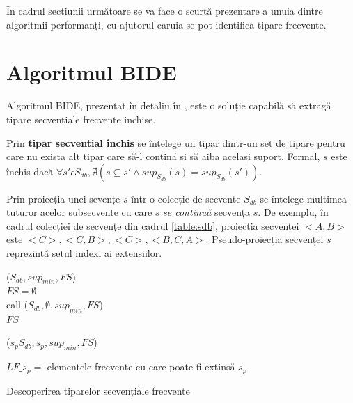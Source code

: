 În cadrul sectiunii următoare se va face o scurtă prezentare a unuia dintre algoritmii performanți, cu ajutorul caruia se pot identifica tipare frecvente. 

\section{Algoritmul BIDE}
Algoritmul BIDE, prezentat în detaliu în \cite{bib:wang2004bide}, este o soluție capabilă să extragă tipare secventiale frecvente inchise.

\begin{defi}
Prin \textbf{tipar secvential închis} se întelege un tipar dintr-un set de tipare pentru care nu exista alt tipar care să-l conțină și să aiba același suport. Formal, $s$ este închis dacă $\forall s' \epsilon S_{db}, \nexists (s \subseteq s' \wedge sup_{S_{db}}(s)=sup_{S_{db}}(s'))$.
\end{defi}  

\begin{defi}
Prin proiecția unei sevențe $s$ într-o colecție de secvente $S_{db}$ se întelege multimea tuturor acelor subsecvente cu care $s$ \textit{se continuă} secvența $s$. De exemplu, în cadrul colecției de secvențe din cadrul \ref{table:sdb}, proiectia secventei $<A,B>$ este {$<C>,<C, B>,<C>,<B, C, A>$}. Pseudo-proiecția secvenței $s$ reprezintă setul indexi ai extensiilor. 
\end{defi}  


\begin{algorithm}[H]
\SetAlgoLined
{}
\fse($S_{db}, sup_{min}, FS$) \\
$FS = \emptyset$ \\
call \fs($S_{db}, \emptyset, sup_{min}, FS$) \\
\KwRet $FS$ \\

\BlankLine
\BlankLine

\fs($s_pS_{db}, s_p, sup_{min}, FS$) \\


$LF\_s_p =$ elementele frecvente cu care poate fi extinsă $s_p$

 {
\KwRet
}

\caption{Descoperirea tiparelor secvențiale frecvente}
\label{algo:fse}
\end{algorithm}

